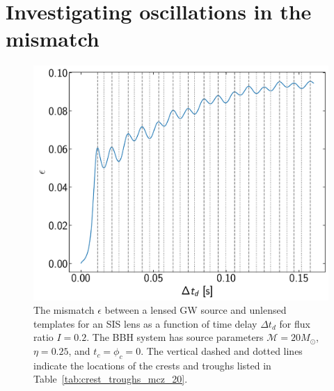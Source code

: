 \documentclass[floats,floatfix,showpacs,amssymb,prd,twocolumn,superscriptaddress,nofootinbib,nolongbibliography,reprint]{revtex4-2}
\begin{document}
\section{\label{appendix:Investigating striations in the mismatch}Investigating oscillations in the mismatch}

\begin{figure}[t!]
    \centering
    \includegraphics[scale = 0.38]{Figures/mismatch_mcz_20_I_0.2.pdf}
    \caption{
    The mismatch $\epsilon$ between a lensed GW source and unlensed templates for an SIS lens as a function of time delay $\Delta t_d$ for flux ratio $I = 0.2$. The BBH system has source parameters $\mathcal{M} = 20 M_\odot$, $\eta = 0.25$, and $t_c = \phi_c = 0$.  The vertical dashed and dotted lines indicate the locations of the crests and troughs listed in Table~\ref{tab:crest_troughs_mcz_20}.
    }
    \label{fig:mismatch_mcz_20_I_0.2}
\end{figure}
\end{document}
